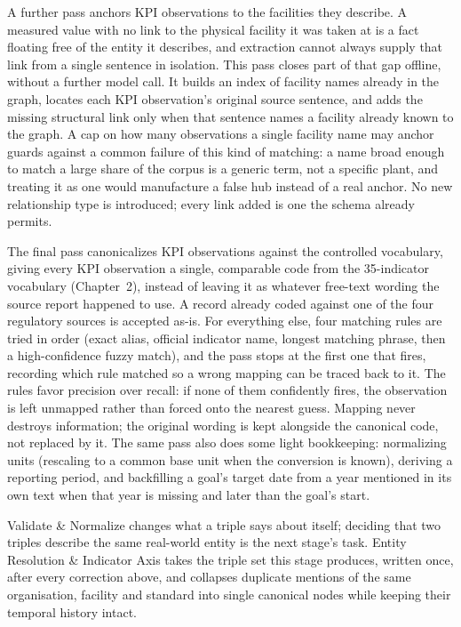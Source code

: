 \documentclass[fontsize=12pt,oneside,headings=small]{scrreprt}
\begin{document}
A further pass anchors KPI observations to the facilities they describe. A measured value with no link to the physical facility it was taken at is a fact floating free of the entity it describes, and extraction cannot always supply that link from a single sentence in isolation. This pass closes part of that gap offline, without a further model call. It builds an index of facility names already in the graph, locates each KPI observation's original source sentence, and adds the missing structural link only when that sentence names a facility already known to the graph. A cap on how many observations a single facility name may anchor guards against a common failure of this kind of matching: a name broad enough to match a large share of the corpus is a generic term, not a specific plant, and treating it as one would manufacture a false hub instead of a real anchor. No new relationship type is introduced; every link added is one the schema already permits.

The final pass canonicalizes KPI observations against the controlled vocabulary, giving every KPI observation a single, comparable code from the 35-indicator vocabulary (Chapter~2), instead of leaving it as whatever free-text wording the source report happened to use. A record already coded against one of the four regulatory sources is accepted as-is. For everything else, four matching rules are tried in order (exact alias, official indicator name, longest matching phrase, then a high-confidence fuzzy match), and the pass stops at the first one that fires, recording which rule matched so a wrong mapping can be traced back to it. The rules favor precision over recall: if none of them confidently fires, the observation is left unmapped rather than forced onto the nearest guess. Mapping never destroys information; the original wording is kept alongside the canonical code, not replaced by it. The same pass also does some light bookkeeping: normalizing units (rescaling to a common base unit when the conversion is known), deriving a reporting period, and backfilling a goal's target date from a year mentioned in its own text when that year is missing and later than the goal's start.

Validate \& Normalize changes what a triple says about itself; deciding that two triples describe the same real-world entity is the next stage's task. Entity Resolution \& Indicator Axis takes the triple set this stage produces, written once, after every correction above, and collapses duplicate mentions of the same organisation, facility and standard into single canonical nodes while keeping their temporal history intact.
\end{document}
